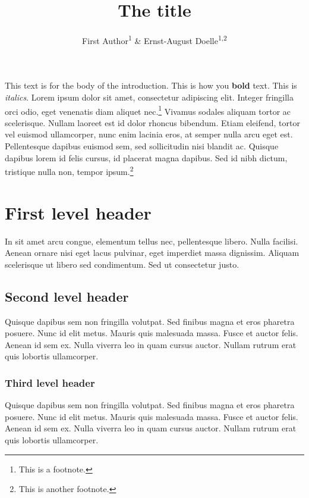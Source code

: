 \documentclass[
  english,
  man,floatsintext]{apa6}
\title{The title}
\author{First Author\textsuperscript{1} \& Ernst-August Doelle\textsuperscript{1,2}}
\date{}
\affiliation{\vspace{0.5cm}\textsuperscript{1} Wilhelm-Wundt-University\\\textsuperscript{2} Konstanz Business School}
\begin{document}
\maketitle

This text is for the body of the introduction. This is how you \textbf{bold} text. This is \emph{italics}. Lorem ipsum dolor sit amet, consectetur adipiscing elit. Integer fringilla orci odio, eget venenatis diam aliquet nec.\footnote{This is a footnote.} Vivamus sodales aliquam tortor ac scelerisque. Nullam laoreet est id dolor rhoncus bibendum. Etiam eleifend, tortor vel euismod ullamcorper, nunc enim lacinia eros, at semper nulla arcu eget est. Pellentesque dapibus euismod sem, sed sollicitudin nisi blandit ac. Quisque dapibus lorem id felis cursus, id placerat magna dapibus. Sed id nibh dictum, tristique nulla non, tempor ipsum.\footnote{This is another footnote.}

\hypertarget{first-level-header}{%
\section{First level header}\label{first-level-header}}

In sit amet arcu congue, elementum tellus nec, pellentesque libero. Nulla facilisi. Aenean ornare nisi eget lacus pulvinar, eget imperdiet massa dignissim. Aliquam scelerisque ut libero sed condimentum. Sed ut consectetur justo.

\hypertarget{second-level-header}{%
\subsection{Second level header}\label{second-level-header}}

Quisque dapibus sem non fringilla volutpat. Sed finibus magna et eros pharetra posuere. Nunc id elit metus. Mauris quis malesuada massa. Fusce et auctor felis. Aenean id sem ex. Nulla viverra leo in quam cursus auctor. Nullam rutrum erat quis lobortis ullamcorper.

\hypertarget{third-level-header}{%
\subsubsection{Third level header}\label{third-level-header}}

Quisque dapibus sem non fringilla volutpat. Sed finibus magna et eros pharetra posuere. Nunc id elit metus. Mauris quis malesuada massa. Fusce et auctor felis. Aenean id sem ex. Nulla viverra leo in quam cursus auctor. Nullam rutrum erat quis lobortis ullamcorper.
\end{document}
